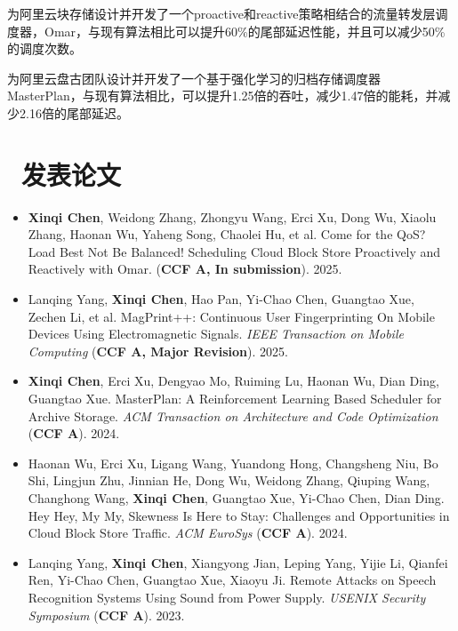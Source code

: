 \documentclass{resume}
\begin{document}
为阿里云块存储设计并开发了一个proactive和reactive策略相结合的流量转发层调度器，Omar，与现有算法相比可以提升60\%的尾部延迟性能，并且可以减少50\%的调度次数。

为阿里云盘古团队设计并开发了一个基于强化学习的归档存储调度器MasterPlan，与现有算法相比，可以提升1.25倍的吞吐，减少1.47倍的能耗，并减少2.16倍的尾部延迟。


\section{\faFileTextO \ 发表论文}
\begin{itemize}[parsep=0.5ex]
  \item \textbf{Xinqi Chen}, Weidong Zhang, Zhongyu Wang, Erci Xu, Dong Wu, Xiaolu Zhang, Haonan Wu, Yaheng Song, Chaolei Hu, et al. Come for the QoS? Load Best Not Be Balanced! Scheduling Cloud Block Store Proactively and Reactively with
  Omar. (\textbf{CCF A, In submission}). 2025.
  \item Lanqing Yang, \textbf{Xinqi Chen}, Hao Pan, Yi-Chao Chen, Guangtao Xue, Zechen Li, et al. MagPrint++: Continuous User Fingerprinting On
  Mobile Devices Using Electromagnetic Signals. \textit{IEEE Transaction on Mobile Computing} (\textbf{CCF A, Major Revision}). 2025.
  \item \textbf{Xinqi Chen}, Erci Xu, Dengyao Mo, Ruiming Lu, Haonan Wu, Dian Ding, Guangtao Xue. MasterPlan: A Reinforcement Learning Based Scheduler for Archive Storage. \textit{ACM Transaction on Architecture and Code Optimization} (\textbf{CCF A}). 2024.
  \item Haonan Wu, Erci Xu, Ligang Wang, Yuandong Hong, Changsheng Niu, Bo Shi, Lingjun Zhu, Jinnian He, Dong Wu, Weidong Zhang, Qiuping Wang, Changhong Wang, \textbf{Xinqi Chen}, Guangtao Xue, Yi-Chao Chen, Dian Ding. Hey Hey, My My, Skewness Is Here to Stay: Challenges and Opportunities in Cloud Block Store Traffic. \textit{ACM EuroSys} (\textbf{CCF A}). 2024.
  \item Lanqing Yang, \textbf{Xinqi Chen}, Xiangyong Jian, Leping Yang, Yijie Li, Qianfei Ren, Yi-Chao Chen, Guangtao Xue, Xiaoyu Ji. Remote Attacks on Speech Recognition Systems Using Sound from Power Supply. \textit{USENIX Security Symposium} (\textbf{CCF A}). 2023.
\end{itemize}
\end{document}
